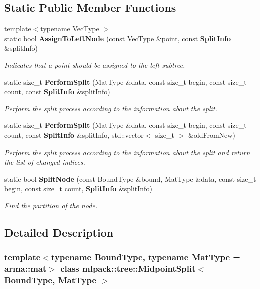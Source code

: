 \subsection*{Static Public Member Functions}
\begin{DoxyCompactItemize}
\item 
{\footnotesize template$<$typename Vec\+Type $>$ }\\static bool \textbf{ Assign\+To\+Left\+Node} (const Vec\+Type \&point, const \textbf{ Split\+Info} \&split\+Info)
\begin{DoxyCompactList}\small\item\em Indicates that a point should be assigned to the left subtree. \end{DoxyCompactList}\item 
static size\+\_\+t \textbf{ Perform\+Split} (Mat\+Type \&data, const size\+\_\+t begin, const size\+\_\+t count, const \textbf{ Split\+Info} \&split\+Info)
\begin{DoxyCompactList}\small\item\em Perform the split process according to the information about the split. \end{DoxyCompactList}\item 
static size\+\_\+t \textbf{ Perform\+Split} (Mat\+Type \&data, const size\+\_\+t begin, const size\+\_\+t count, const \textbf{ Split\+Info} \&split\+Info, std\+::vector$<$ size\+\_\+t $>$ \&old\+From\+New)
\begin{DoxyCompactList}\small\item\em Perform the split process according to the information about the split and return the list of changed indices. \end{DoxyCompactList}\item 
static bool \textbf{ Split\+Node} (const Bound\+Type \&bound, Mat\+Type \&data, const size\+\_\+t begin, const size\+\_\+t count, \textbf{ Split\+Info} \&split\+Info)
\begin{DoxyCompactList}\small\item\em Find the partition of the node. \end{DoxyCompactList}\end{DoxyCompactItemize}


\subsection{Detailed Description}
\subsubsection*{template$<$typename Bound\+Type, typename Mat\+Type = arma\+::mat$>$\newline
class mlpack\+::tree\+::\+Midpoint\+Split$<$ Bound\+Type, Mat\+Type $>$}

